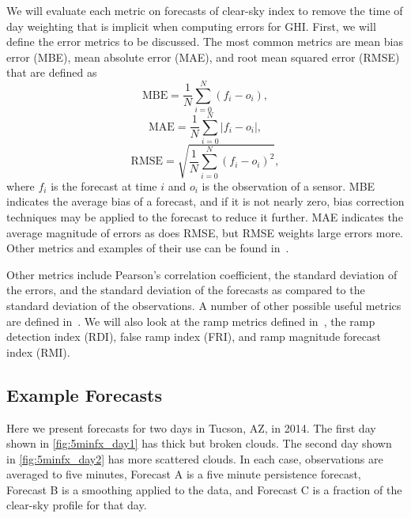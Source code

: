 We will evaluate each metric on forecasts of clear-sky index to remove
the time of day weighting that is implicit when computing errors for
GHI.
First, we will define the error metrics to be discussed.
The most common metrics are mean bias error (MBE), mean absolute error
(MAE), and root mean squared error (RMSE) that are defined as
\begin{equation}
\mbox{MBE} = \frac{1}{N} \sum_{i=0}^N (f_i - o_i),
\end{equation}
\begin{equation}
\mbox{MAE} = \frac{1}{N} \sum_{i=0}^N |f_i - o_i|,
\end{equation}
\begin{equation}
\mbox{RMSE} = \sqrt{\frac{1}{N} \sum_{i=0}^N (f_i - o_i)^2},
\end{equation}
where $f_i$ is the forecast at time $i$ and $o_i$ is the observation
of a sensor.
MBE indicates the average bias of a forecast, and if it is not nearly
zero, bias correction techniques may be applied to the forecast to
reduce it further.
MAE indicates the average magnitude of errors as does RMSE, but RMSE
weights large errors more.
Other metrics and examples of their use can be found
in~\cite{Zhang2015,Jensen2016}.

Other metrics include Pearson's correlation coefficient, the standard
deviation of the errors, and the standard deviation of the forecasts
as compared to the standard deviation of the observations.
A number of other possible useful metrics are defined
in~\cite{Zhang2015}.
We will also look at the ramp metrics defined in~\cite{Chu2015b}, the
ramp detection index (RDI), false ramp index (FRI), and ramp
magnitude forecast index (RMI).

\subsection{Example Forecasts}
Here we present forecasts for two days in Tucson, AZ, in 2014.
The first day shown in \cref{fig:5minfx_day1} has thick but broken
clouds.
The second day shown in \cref{fig:5minfx_day2} has more scattered
clouds.
In each case, observations are averaged to five minutes, Forecast A is
a five minute persistence forecast, Forecast B is a smoothing applied
to the data, and Forecast C is a fraction of the clear-sky profile for
that day.


